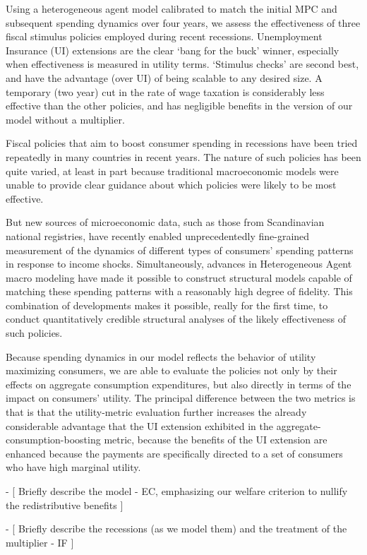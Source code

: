 \documentclass[../HAFiscal]{subfiles}
\begin{document}
Using a heterogeneous agent model calibrated to match the initial MPC and subsequent spending dynamics over four years, we assess the effectiveness of three fiscal stimulus policies employed during recent recessions.  Unemployment Insurance (UI) extensions are the clear `bang for the buck' winner, especially when effectiveness is measured in utility terms.  `Stimulus checks' are second best, and have the advantage (over UI) of being scalable to any desired size.  A temporary (two year) cut in the rate of wage taxation is considerably less effective than the other policies, and has negligible benefits in the version of our model without a multiplier.

Fiscal policies that aim to boost consumer spending in recessions have been tried repeatedly in many countries in recent years.  The nature of such policies has been quite varied, at least in part because traditional macroeconomic models were unable to provide clear guidance about which policies were likely to be most effective.

But new sources of microeconomic data, such as those from Scandinavian national registries, have recently enabled unprecedentedly fine-grained measurement of the dynamics of different types of consumers' spending patterns in response to income shocks.  Simultaneously, advances in Heterogeneous Agent macro modeling have made it possible to construct structural models capable of matching these spending patterns with a reasonably high degree of fidelity.  This combination of developments makes it possible, really for the first time, to conduct quantitatively credible structural analyses of the likely effectiveness of such policies.

Because spending dynamics in our model reflects the behavior of utility maximizing consumers, we are able to evaluate the policies not only by their effects on aggregate consumption expenditures, but also directly in terms of the impact on consumers' utility.  The principal difference between the two metrics is that is that the utility-metric evaluation further increases the already considerable advantage that the UI extension exhibited in the aggregate-consumption-boosting metric, because the benefits of the UI extension are enhanced because the payments are specifically directed to a set of consumers who have high marginal utility.

- [ Briefly describe the model - EC, emphasizing our welfare criterion to nullify the redistributive benefits ]

- [ Briefly describe the recessions (as we model them) and the treatment of the multiplier - IF ]
\end{document}
